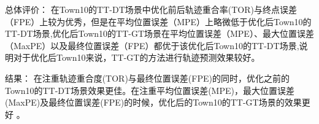 总体评价：
在Town10的TT-DT场景中优化前后轨迹重合率(TOR)与终点误差（FPE）上较为优秀，但是在平均位置误差（MPE）上略微低于优化后Town10的TT-DT场景,优化后Town10的TT-GT场景在平均位置误差（MPE）、最大位置误差（MaxPE）以及最终位置误差（FPE）都优于该优化后Town10的TT-DT场景,说明对于优化后Town10来说，TT-GT的方法进行轨迹预测效果较好。

结果：
在注重轨迹重合度(TOR)与最终位置误差(FPE)的同时，优化之前的Town10的TT-DT场景效果更佳。在注重平均位置误差(MPE)，最大位置误差(MaxPE)及最终位置误差(FPE)的时候，优化后的Town10的TT-GT场景的效果更好 。


















